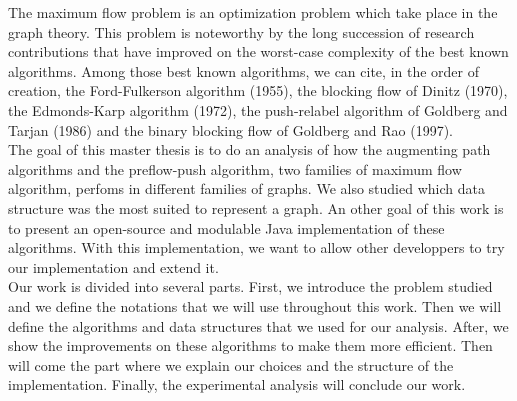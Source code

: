 The maximum flow problem is an optimization problem which take place in the graph theory. This problem is noteworthy by the long succession of research contributions that have improved on the worst-case complexity of the best known algorithms. Among those best known algorithms, we can cite, in the order of creation, the Ford-Fulkerson algorithm (1955), the blocking flow of Dinitz (1970), the Edmonds-Karp algorithm (1972), the push-relabel algorithm of Goldberg and Tarjan (1986) and the binary blocking flow of Goldberg and Rao (1997). \\

The goal of this master thesis is to do an analysis of how the augmenting path algorithms and the preflow-push algorithm, two families of maximum flow algorithm, perfoms in different families of graphs. We also studied which data structure was the most suited to represent a graph. An other goal of this work is to present an open-source and modulable Java implementation of these algorithms. With this implementation, we want to allow other developpers to try our implementation and extend it. \\

Our work is divided into several parts. First, we introduce the problem studied and we define the notations that we will use throughout this work. Then we will define the algorithms and data structures that we used for our analysis. After, we show the improvements on these algorithms to make them more efficient. Then will come the part where we explain our choices and the structure of the implementation. Finally, the experimental analysis will conclude our work.\\




